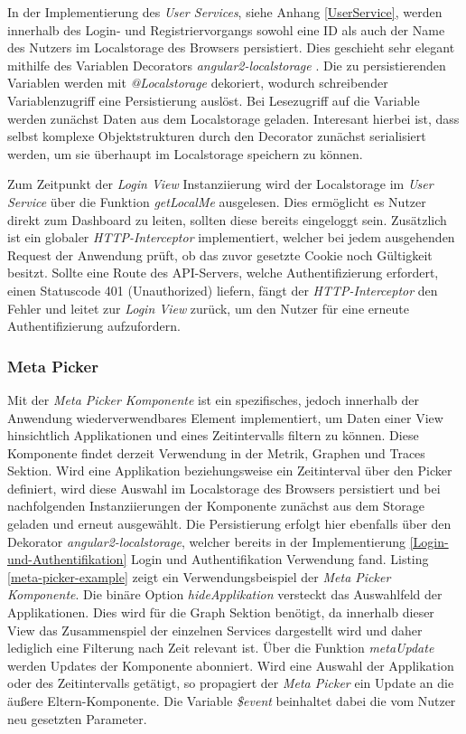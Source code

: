 In der Implementierung des \emph{User Services}, siehe Anhang \ref{UserService}, werden innerhalb des Login- und Registriervorgangs
sowohl eine ID als auch der Name des Nutzers im Localstorage des Browsers persistiert.
Dies geschieht sehr elegant mithilfe des Variablen Decorators \emph{angular2-localstorage} \cite{marcj95:online}.
Die zu persistierenden Variablen werden mit \emph{@Localstorage} dekoriert, wodurch schreibender Variablenzugriff eine Persistierung auslöst.
Bei Lesezugriff auf die Variable werden zunächst Daten aus dem Localstorage geladen.
Interesant hierbei ist, dass selbst komplexe Objektstrukturen durch den Decorator zunächst serialisiert werden, um sie überhaupt im Localstorage speichern zu können.

Zum Zeitpunkt der \emph{Login View} Instanziierung wird der Localstorage im \emph{User Service} über die Funktion \emph{getLocalMe} ausgelesen.
Dies ermöglicht es Nutzer direkt zum Dashboard zu leiten, sollten diese bereits eingeloggt sein.
Zusätzlich ist ein globaler \emph{HTTP-Interceptor} implementiert, welcher bei jedem ausgehenden Request der Anwendung prüft, ob das zuvor gesetzte Cookie noch Gültigkeit besitzt.
Sollte eine Route des \ac{API}-Servers, welche Authentifizierung erfordert, einen Statuscode 401 (Unauthorized) liefern,
fängt der \emph{HTTP-Interceptor} den Fehler und leitet zur \emph{Login View} zurück, um den Nutzer für eine erneute Authentifizierung aufzufordern.




\subsubsection{Meta Picker}

Mit der \emph{Meta Picker Komponente} ist ein spezifisches, jedoch innerhalb der Anwendung wiederverwendbares Element implementiert, um Daten einer View hinsichtlich Applikationen und eines Zeitintervalls filtern zu können.
Diese Komponente findet derzeit Verwendung in der Metrik, Graphen und Traces Sektion. Wird eine Applikation beziehungsweise ein Zeitinterval über den Picker definiert,
wird diese Auswahl im Localstorage des Browsers persistiert und bei nachfolgenden Instanziierungen der Komponente zunächst aus dem Storage geladen und erneut ausgewählt.
Die Persistierung erfolgt hier ebenfalls über den Dekorator \emph{angular2-localstorage},
welcher bereits in der Implementierung \ref{Login-und-Authentifikation} Login und Authentifikation Verwendung fand.
Listing \ref{meta-picker-example} zeigt ein Verwendungsbeispiel der \emph{Meta Picker Komponente}.
Die binäre Option \emph{hideApplikation} versteckt das Auswahlfeld der Applikationen. Dies wird für die Graph Sektion benötigt,
da innerhalb dieser View das Zusammenspiel der einzelnen Services dargestellt wird und daher lediglich eine Filterung nach Zeit relevant ist.
Über die Funktion \emph{metaUpdate} werden Updates der Komponente abonniert. Wird eine Auswahl der Applikation oder des Zeitintervalls getätigt,
so propagiert der \emph{Meta Picker} ein Update an die äußere Eltern-Komponente. Die Variable \emph{\$event} beinhaltet dabei die vom Nutzer neu gesetzten Parameter.


